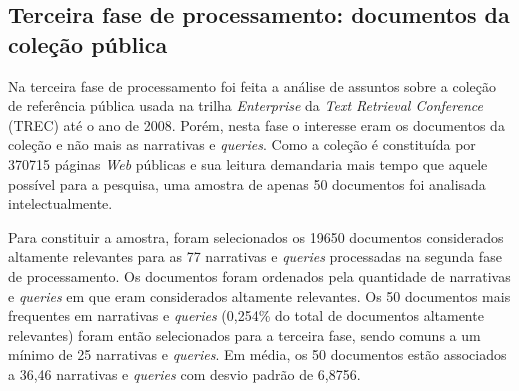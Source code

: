







\subsection{Terceira fase de processamento: documentos da coleção pública}
\label{terceira}

Na terceira fase de processamento foi feita a análise de assuntos sobre a coleção de referência pública usada na trilha \textit{Enterprise} da \textit{Text Retrieval Conference} (TREC) até o ano de 2008. Porém, nesta fase o interesse eram os documentos da coleção e não mais as narrativas e \textit{queries}. Como a coleção é constituída por 370715 páginas \textit{Web} públicas e sua leitura demandaria mais tempo que aquele possível para a pesquisa, uma amostra de apenas 50 documentos foi analisada intelectualmente.

Para constituir a amostra, foram selecionados os 19650 documentos considerados altamente relevantes para as 77 narrativas e \textit{queries} processadas na segunda fase de processamento. Os documentos foram ordenados pela quantidade de narrativas e \textit{queries} em que eram considerados altamente relevantes. Os 50 documentos mais frequentes em narrativas e \textit{queries} (0,254\% do total de documentos altamente relevantes) foram então selecionados para a terceira fase, sendo comuns a um mínimo de 25 narrativas e \textit{queries}. Em média, os 50 documentos estão associados a 36,46 narrativas e \textit{queries} com desvio padrão de 6,8756.


